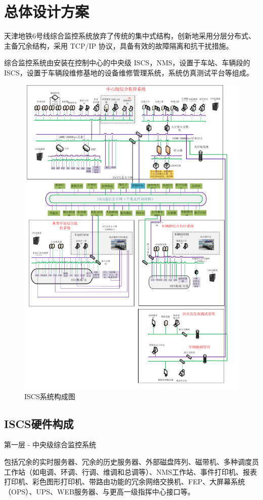 \section{总体设计方案}
天津地铁6号线综合监控系统放弃了传统的集中式结构，创新地采用分层分布式、主备冗余结构，采用 TCP/IP 协议，具备有效的故障隔离和抗干扰措施。 

综合监控系统由安装在控制中心的中央级 ISCS，NMS，设置于车站、车辆段的 ISCS，设置于车辆段维修基地的设备维修管理系统，系统仿真测试平台等组成。

\begin{figure}[h]
	\centering
	\includegraphics[width=0.8\linewidth]{figures/ISCS系统构成图}
	\caption{ISCS系统构成图}
	\label{fig:ISCS系统构成图}
\end{figure}

\subsection{ISCS硬件构成}
第一层 - 中央级综合监控系统

包括冗余的实时服务器、冗余的历史服务器、外部磁盘阵列、磁带机、多种调度员工作站（如电调、环调、行调、维调和总调等）、NMS工作站、事件打印机、报表打印机、彩色图形打印机、带路由功能的冗余网络交换机、FEP、大屏幕系统（OPS）、UPS、WEB服务器、与更高一级指挥中心接口等。

